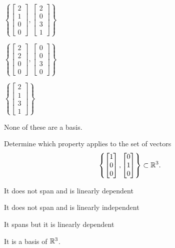 \documentclass{article}[12pt]
\begin{document}
\begin{readinessAssuranceTest}
\begin{multicols}{4}
\begin{readinessAssuranceTestChoices}
\item $\left\{ \begin{bmatrix} 2 \\ 1 \\ 0 \\ 0 \end{bmatrix}, \begin{bmatrix} 2 \\ 0 \\ 3 \\ 1 \end{bmatrix} \right\}$
\item $\left\{ \begin{bmatrix} 2 \\ 2 \\ 0 \\ 0 \end{bmatrix}, \begin{bmatrix} 0 \\ 0 \\ 3 \\ 0 \end{bmatrix} \right\}$
\item $\left\{ \begin{bmatrix} 2 \\ 1 \\ 3 \\ 1 \end{bmatrix} \right\}$
\item None of these are a basis.
\end{readinessAssuranceTestChoices}
\end{multicols}


\item Determine which property applies to the set of vectors $$\left\{ \begin{bmatrix}  1 \\ 0 \\ 0 \end{bmatrix}, \begin{bmatrix} 0 \\ 1 \\ 0 \end{bmatrix} \right\} \subset \mathbb{R}^3.$$

\begin{readinessAssuranceTestChoices}
\item It does not span and is linearly dependent
\item It does not span and is linearly independent
\item It spans but it is linearly dependent
\item It is a basis of $\mathbb{R}^3$.
\end{readinessAssuranceTestChoices}



\end{readinessAssuranceTest}
\end{document}
